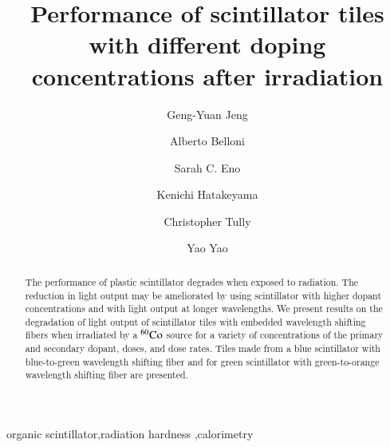 \documentclass[review]{elsarticle}
\begin{document}
\begin{frontmatter}

\title{Performance of scintillator tiles with different doping concentrations after irradiation }


\author[umd]{Geng-Yuan Jeng}
\author[umd]{Alberto Belloni}
\author[umd]{Sarah C. Eno}
\author[baylor]{Kenichi Hatakeyama}
\author[princeton]{Christopher Tully}
\author[umd]{Yao Yao}


\address[umd]{Dept. Physics, U. Maryland, College Park MD 30742 USA}
\address[eljen]{Eljen Technology, 1300 W. Broadway, Sweetwater, Tx 79556 USA}
\address[fnal]{Fermi National Accelerator Laboratory, Batavia, IL, USA}
\address[baylor]{Baylor University, Waco, Texas, USA}
\address[princeton]{Princeton University, Princeton, NJ, USA}

\begin{abstract}
The performance of plastic scintillator degrades when exposed to radiation. 
The reduction in light output may be ameliorated by using scintillator
with higher dopant concentrations and with light output at longer wavelengths.
We present results on the degradation of light output of scintillator
tiles with embedded wavelength shifting  fibers  when irradiated by a $\rm{^{60}Co}$ source for a variety of concentrations of the primary and secondary dopant, doses, and dose rates.  Tiles made from a blue scintillator with blue-to-green wavelength shifting fiber and for green scintillator with green-to-orange wavelength shifting fiber are presented.
\end{abstract}

\begin{keyword}
organic scintillator\sep radiation hardness \sep calorimetry
\end{keyword}

\end{frontmatter}

\linenumbers
\end{document}
